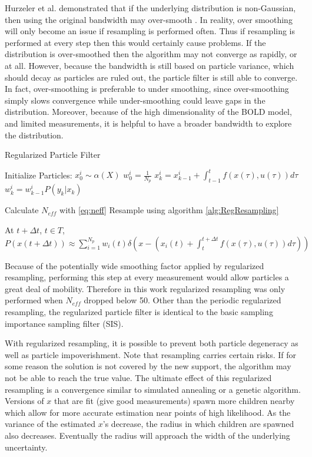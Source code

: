 Hurzeler et al. demonstrated that if the underlying 
distribution is non-Gaussian, then using the original bandwidth may over-smooth
\cite{Hurzeler1998}.  In reality, over smoothing
will only become an issue if resampling is performed often. Thus
if resampling is performed at every step then this would certainly cause problems.
If the distribution is over-smoothed then the algorithm may not converge as rapidly,
or at all. However, because the bandwidth is still based on particle variance, 
which should decay as particles are ruled out, the particle filter is still able to converge. 
In fact, over-smoothing is preferable
to under smoothing, since over-smoothing simply slows convergence while 
under-smoothing could leave gaps in the distribution.
Moreover, because of the high dimensionality of the BOLD model,
and limited measurements, it is helpful to have a broader bandwidth to explore the distribution. 

\begin{algorithm}
\caption{Regularized Particle Filter}
\begin{algorithmic}
\STATE Initialize Particles:
    \STATE $x^i_0  \sim \alpha(X)$
    \STATE $w^i_0 = \frac{1}{N_p}$
\ENDFOR
{}
        \STATE $x^i_k = x^i_{k-1} + \int_{t-1}^t f(x(\tau), u(\tau)) d\tau $
        \STATE $w^i_k = w^i_{k-1}P(y_k | x_k)$
    \ENDFOR

    \STATE Calculate $N_{eff}$ with \autoref{eq:neff}
        \STATE Resample using algorithm \autoref{alg:RegResampling}
    \ENDIF
\ENDFOR

\STATE At $t + \Delta t$, $t \in T$, $P(x(t+\Delta t)) \approx 
\sum_{i=1}^{N_p} w_i(t)\delta\left(x - (x_i(t) + \int_t^{t+\Delta t} f(x(\tau), u(\tau)) d\tau) \right)$
 \end{algorithmic}
 \label{alg:RegularizedParticleFilter}
 \end{algorithm}

Because 
of the potentially wide smoothing factor applied by regularized resampling, performing this
step at every measurement would allow particles a great deal of mobility. Therefore
in this work regularized resampling was only performed when $N_{eff}$ dropped
below 50. Other than the periodic regularized
resampling, the regularized particle filter is identical to the basic sampling
importance sampling filter (SIS). 

With regularized resampling, it is possible to prevent both
particle degeneracy as well as particle impoverishment. 
Note that resampling carries certain risks.  
If for some reason the solution is not covered by the 
new support, the algorithm may not be able to reach the true value. 
The ultimate effect of this regularized resampling is a convergence 
similar to simulated annealing or a genetic algorithm. 
Versions of $x$ that are fit (give good measurements) spawn more children 
nearby which allow for more accurate estimation near points of high likelihood. 
As the variance of the estimated $x$'s decrease, the radius in 
which children are spawned also decreases. Eventually the radius
will approach the width of the underlying uncertainty.

